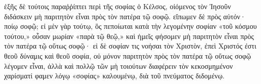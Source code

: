 ἑξῆς δὲ τούτοις παραῤῥίπτει περὶ τῆς σοφίας ὁ Κέλσος, οἰόμενος τὸν Ἰησοῦν διδάσκειν μὴ παριτητὸν εἶναι πρὸς τὸν πατέρα τῷ σοφῷ. εἴπωμεν δὲ πρὸς αὐτόν· ποίῳ σοφῷ; εἰ μὲν γὰρ τούτῳ, ὃς πεποίωται κατὰ τὴν λεγομένην σοφίαν «τοῦ κόσμου τούτου,» οὖσαν μωρίαν «παρὰ τῷ θεῷ,» καὶ ἡμεῖς φήσομεν μὴ παριτητὸν εἶναι πρὸς τὸν πατέρα τῷ οὕτως σοφῷ· εἰ δὲ σοφίαν τις νοήσαι τὸν Χριστὸν, ἐπεὶ Χριστός ἐστι θεοῦ δύναμις καὶ θεοῦ σοφία, οὐ μόνον παριτητὸν πρὸς τὸν πατέρα τῷ οὕτως σοφῷ λέγομεν εἶναι, ἀλλὰ καὶ πολλῷ τῶν μὴ τοιούτων διαφέρειν τὸν κεκοσμημένον χαρίσματί φαμεν λόγῳ «σοφίας» καλουμένῳ, διὰ τοῦ πνεύματος διδομένῳ.